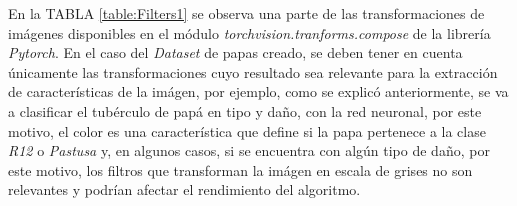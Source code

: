 			En la TABLA \ref{table:Filters1} se observa una parte de las transformaciones de imágenes disponibles en el módulo \textit{torchvision.tranforms.compose} de la librería \textit{Pytorch}. En el caso del \textit{Dataset} de papas creado, se deben tener en cuenta únicamente las transformaciones cuyo resultado sea relevante para la extracción de características de la imágen, por ejemplo, como se explicó anteriormente, se va a clasificar el tubérculo de papá en tipo y daño, con la red neuronal, por este motivo, el color es una característica que define si la papa pertenece a la clase \textit{R12} o \textit{Pastusa} y, en algunos casos, si se encuentra con algún tipo de daño, por este motivo, los filtros que transforman la imágen en escala de grises no son relevantes y podrían afectar el rendimiento del algoritmo.
		
